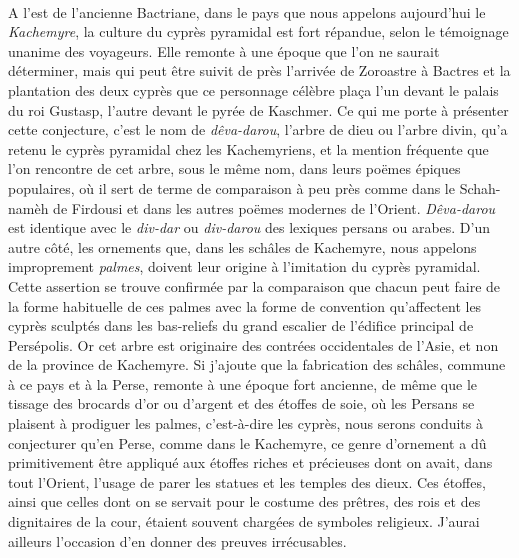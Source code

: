 \documentclass[a4paper, 11pt, oneside, polutonikogreek, french]{article}
\begin{document}
\paragraph{}
A l'est de l'ancienne Bactriane, dans le pays que nous appelons aujourd'hui le \emph{Kachemyre}, la culture du cyprès pyramidal est fort répandue, selon le témoignage unanime des voyageurs. Elle remonte à une époque que l'on ne saurait déterminer, mais qui peut être suivit de près l'arrivée de Zoroastre à Bactres et la plantation des deux cyprès que ce personnage célèbre plaça l'un devant le palais du roi Gustasp, l'autre devant le pyrée de Kaschmer. Ce qui me porte à présenter cette conjecture, c'est le nom de \emph{dêva-darou}, l'arbre de dieu ou l'arbre divin, qu'a retenu le cyprès pyramidal chez les Kachemyriens, et la mention fréquente que l'on rencontre de cet arbre, sous le même nom, dans leurs poëmes épiques populaires, où il sert de terme de comparaison à peu près comme dans le Schah-namèh de Firdousi et dans les autres poëmes modernes de l'Orient. \emph{Dêva-darou} est identique avec le \emph{div-dar} ou \emph{div-darou} des lexiques persans ou arabes. D'un autre côté, les ornements que, dans les schâles de Kachemyre, nous appelons improprement \emph{palmes}, doivent leur origine à l'imitation du cyprès pyramidal. Cette assertion se trouve confirmée par la comparaison que chacun peut faire de la forme habituelle de ces palmes avec la forme de convention qu'affectent les cyprès sculptés dans les bas-reliefs du grand escalier de l'édifice principal de Persépolis. Or cet arbre est originaire des contrées occidentales de l'Asie, et non de la province de Kachemyre. Si j'ajoute que la fabrication des schâles, commune à ce pays et à la Perse, remonte à une époque fort ancienne, de même que le tissage des brocards d'or ou d'argent et des étoffes de soie, où les Persans se plaisent à prodiguer les palmes, c'est-à-dire les cyprès, nous serons conduits à conjecturer qu'en Perse, comme dans le Kachemyre, ce genre d'ornement a dû primitivement être appliqué aux étoffes riches et précieuses dont on avait, dans tout l'Orient, l'usage de parer les statues et les temples des dieux. Ces étoffes, ainsi que celles dont on se servait pour le costume des prêtres, des rois et des dignitaires de la cour, étaient souvent chargées de symboles religieux. J'aurai ailleurs l'occasion d'en donner des preuves irrécusables.
\end{document}
